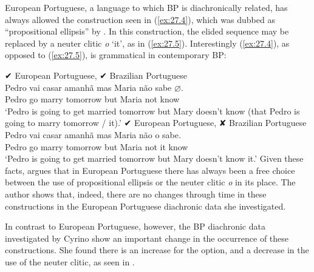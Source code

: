 \documentclass[output=paper]{langsci/langscibook}
\begin{document}
 European Portuguese, a language to which \gls{BP} is diachronically related, has
 always allowed the construction seen in (\ref{ex:27.4}), which was dubbed as
 ``propositional ellipsis'' by \citet{Cyrino1994,Cyrino1997}. In this
 construction, the elided sequence may be replaced by a neuter clitic
 \emph{o} `it', as in (\ref{ex:27.5}).  Interestingly (\ref{ex:27.4}), as
 opposed to (\ref{ex:27.5}), is grammatical in contemporary \gls{BP}:

\ea \label{ex:27.4} ✔ European Portuguese, ✔ Brazilian Portuguese\\
    \gll    Pedro vai casar amanhã   mas Maria  não sabe \textbf{$\varnothing$}.\\
            Pedro go marry tomorrow but   Maria  not  know\\
    \glt    `Pedro is going to get married tomorrow but Mary doesn't know (that Pedro is going to marry tomorrow / it).'
\ex \label{ex:27.5} ✔ European Portuguese, ✘ Brazilian Portuguese\\
    \gll   Pedro vai    casar amanhã    mas Maria  não o sabe.\\
            Pedro go   marry tomorrow but Maria    not  it know\\
    \glt    `Pedro is going to get married tomorrow but Mary doesn't       know it.'
\z
Given these facts, \citet{Cyrino1994,Cyrino1997} argues that in European
Portuguese there has always been a free choice between the use of propositional
ellipsis or the neuter clitic \emph{o} in its place. The author shows that,
indeed, there are no changes through time in these constructions in the
European Portuguese diachronic data she investigated.

In contrast to European Portuguese, however, the \gls{BP} diachronic data
investigated by Cyrino show an important change in the occurrence of these
constructions. She found there is an increase for the  option, and a
decrease in the use of the neuter clitic, as seen in .
\end{document}
